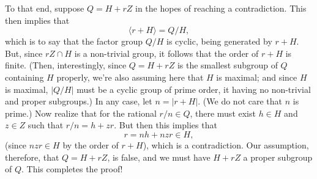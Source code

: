 \documentclass[12pt]{article}
\begin{document}
To that end, suppose $Q=H+rZ$ in the hopes of reaching a contradiction.  This then implies that
\begin{equation*}
\langle r+H\rangle = Q/H,
\end{equation*}
which is to say that the factor group $Q/H$ is cyclic, being generated by $r+H$.
But, since $rZ\cap H$ is a non-trivial group, it follows that the order of $r+H$
is finite.  (Then, interestingly, since $Q=H+rZ$ is the smallest subgroup of $Q$
containing $H$ properly, we're also assuming here that $H$ is maximal; and since $H$
is maximal, $|Q/H|$ must be a cyclic group of prime order, it having no non-trivial
and proper subgroups.)  In any case, let $n=|r+H|$.  (We do not care that $n$ is prime.)
Now realize that for the rational $r/n\in Q$, there must exist $h\in H$ and $z\in Z$
such that $r/n=h+zr$.  But then this implies that
\begin{equation*}
r = nh + nzr\in H,
\end{equation*}
(since $nzr\in H$ by the order of $r+H$), which is a contradiction.
Our assumption, therefore, that $Q=H+rZ$, is false, and we must have
$H+rZ$ a proper subgroup of $Q$.  This completes the proof!
\end{document}

